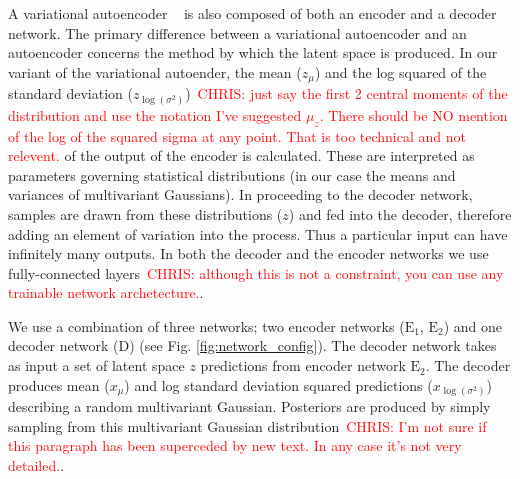 \documentclass[%
showpacs,
 amsmath,amssymb,
 aps,
 twocolumn,
 prl,
 reprint,
floatfix,
]{revtex4-1}
\newcommand{\chris}[1]{\textcolor{red}{CHRIS: #1}}
\begin{document}
%
%
A variational autoencoder ~\cite{1812.04405} is also composed of both an
encoder and a decoder network. The primary difference between a variational
autoencoder and an autoencoder concerns the method by which the latent space is
produced. In our variant of the variational autoender, the mean ($z_{\mu}$) and
the log squared of the standard deviation
($z_{\log{(\sigma^{2})}}$)~\chris{just say the first 2 central moments of the
distribution and use the notation I've suggested $\mu_{z}$. There should be NO
mention of the log of the squared sigma at any point. That is too technical and
not relevent.} of the output of the encoder is calculated. These are
interpreted as parameters governing statistical distributions (in our case the
means and variances of multivariant Gaussians). In proceeding to the decoder
network, samples are drawn from these distributions ($z$) and fed into the
decoder, therefore adding an element of variation into the process.  Thus a
particular input can have infinitely many outputs. In both the decoder and the
encoder networks we use fully-connected layers~\chris{although this is not a
constraint, you can use any trainable network archetecture.}.


%
%
We use a combination of three networks; two encoder networks ($\textrm{E}_1$,
$\textrm{E}_2$) and one decoder network (D) (see Fig.
\ref{fig:network_config}). The decoder network takes as input a set of latent
space $z$ predictions from encoder network $\textrm{E}_2$.  The decoder
produces mean ($x_{\mu}$) and log standard deviation squared predictions
($x_{\log{(\sigma^{2})}}$) describing a random multivariant Gaussian.
Posteriors are produced by simply sampling from this multivariant Gaussian
distribution~\chris{I'm not sure if this paragraph has been superceded by new
text. In any case it's not very detailed.}.

\end{document}
